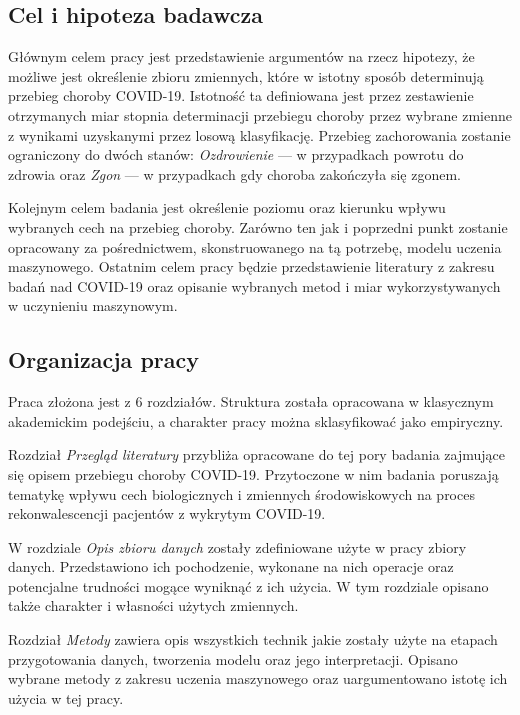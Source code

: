 \documentclass[polish, twoside, 12pt, a4paper]{article}
\theoremstyle{definition}
\theoremstyle{plain}
\theoremstyle{remark}
\begin{document}
\subsection{Cel i hipoteza badawcza}

Głównym celem pracy jest przedstawienie argumentów na rzecz hipotezy, że możliwe jest określenie zbioru zmiennych, które w istotny sposób determinują przebieg choroby COVID-19. Istotność ta definiowana jest przez zestawienie otrzymanych miar stopnia determinacji przebiegu choroby przez wybrane zmienne z wynikami uzyskanymi przez losową klasyfikację. Przebieg zachorowania zostanie ograniczony do dwóch stanów: \emph{Ozdrowienie} --- w przypadkach powrotu do zdrowia oraz \emph{Zgon} --- w przypadkach gdy choroba zakończyła się zgonem.

Kolejnym celem badania jest określenie poziomu oraz kierunku wpływu wybranych cech na przebieg choroby. Zarówno ten jak i poprzedni punkt zostanie opracowany za pośrednictwem, skonstruowanego na tą potrzebę, modelu uczenia maszynowego. Ostatnim celem pracy będzie przedstawienie literatury z zakresu badań nad COVID-19 oraz opisanie wybranych metod i miar wykorzystywanych w uczynieniu maszynowym. 

\subsection{Organizacja pracy}

Praca złożona jest z 6 rozdziałów. Struktura została opracowana w klasycznym akademickim podejściu, a charakter pracy można sklasyfikować jako empiryczny.

Rozdział \emph{Przegląd literatury} przybliża opracowane do tej pory badania zajmujące się opisem przebiegu choroby COVID-19. Przytoczone w nim badania poruszają tematykę wpływu cech biologicznych i zmiennych środowiskowych na proces rekonwalescencji pacjentów z wykrytym COVID-19.

W rozdziale \emph{Opis zbioru danych} zostały zdefiniowane użyte w pracy zbiory danych. Przedstawiono ich pochodzenie, wykonane na nich operacje oraz potencjalne trudności mogące wyniknąć z ich użycia. W tym rozdziale opisano także charakter i własności użytych zmiennych.

Rozdział \emph{Metody} zawiera opis wszystkich technik jakie zostały użyte na etapach przygotowania danych, tworzenia modelu oraz jego interpretacji. Opisano wybrane metody z zakresu uczenia maszynowego oraz uargumentowano istotę ich użycia w tej pracy.
\end{document}
